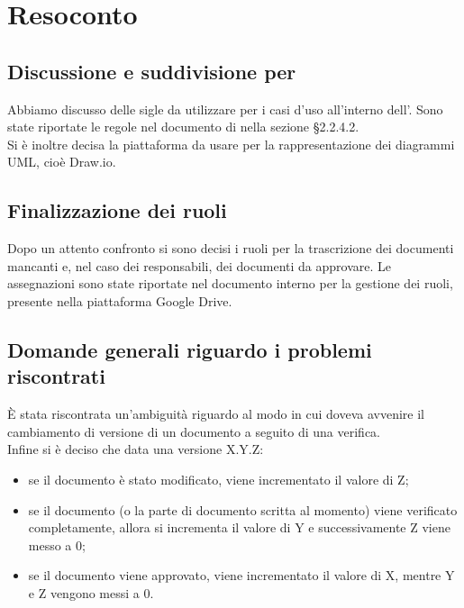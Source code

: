 \section{Resoconto}
\subsection{Discussione e suddivisione per \AdR}
Abbiamo discusso delle sigle da utilizzare per i casi d'uso all'interno dell'\AdR{}. Sono state riportate le regole nel documento di \NdP{} nella sezione \S{2.2.4.2}. \\
Si è inoltre decisa la piattaforma da usare per la rappresentazione dei diagrammi UML, cioè Draw.io.

\subsection{Finalizzazione dei ruoli}
Dopo un attento confronto si sono decisi i ruoli per la trascrizione dei documenti mancanti e, nel caso dei responsabili, dei documenti da approvare. Le assegnazioni sono state riportate nel documento interno per la gestione dei ruoli, presente nella piattaforma Google Drive.

\subsection{Domande generali riguardo i problemi riscontrati}
È stata riscontrata un'ambiguità riguardo al modo in cui doveva avvenire il cambiamento di versione di un documento a seguito di una verifica.\\ 
Infine si è deciso che data una versione X.Y.Z:
\begin{itemize}
\item se il documento è stato modificato, viene incrementato il valore di Z;
\item se il documento (o la parte di documento scritta al momento) viene verificato completamente, allora si incrementa il valore di Y e successivamente Z viene messo a 0;
\item se il documento viene approvato, viene incrementato il valore di X, mentre Y e Z vengono messi a 0.

\end{itemize}

